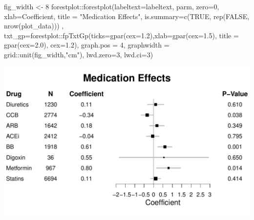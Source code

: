\documentclass[
]{article}
\newenvironment{Shaded}{\begin{snugshade}}{\end{snugshade}}
\newcommand{\AttributeTok}[1]{\textcolor[rgb]{0.77,0.63,0.00}{#1}}
\newcommand{\ConstantTok}[1]{\textcolor[rgb]{0.00,0.00,0.00}{#1}}
\newcommand{\DecValTok}[1]{\textcolor[rgb]{0.00,0.00,0.81}{#1}}
\newcommand{\FloatTok}[1]{\textcolor[rgb]{0.00,0.00,0.81}{#1}}
\newcommand{\FunctionTok}[1]{\textcolor[rgb]{0.00,0.00,0.00}{#1}}
\newcommand{\NormalTok}[1]{#1}
\newcommand{\OtherTok}[1]{\textcolor[rgb]{0.56,0.35,0.01}{#1}}
\newcommand{\SpecialCharTok}[1]{\textcolor[rgb]{0.00,0.00,0.00}{#1}}
\newcommand{\StringTok}[1]{\textcolor[rgb]{0.31,0.60,0.02}{#1}}
\begin{document}
\begin{Shaded}
\begin{Highlighting}[]
\NormalTok{fig\_width }\OtherTok{\textless{}{-}} \DecValTok{8}
\NormalTok{forestplot}\SpecialCharTok{::}\FunctionTok{forestplot}\NormalTok{(}\AttributeTok{labeltext=}\NormalTok{labeltext, }
\NormalTok{                       parm, }
                       \AttributeTok{zero=}\DecValTok{0}\NormalTok{, }
                       \AttributeTok{xlab=}\StringTok{\textquotesingle{}Coefficient\textquotesingle{}}\NormalTok{,}
                       \AttributeTok{title =} \StringTok{"Medication Effects"}\NormalTok{, }
                       \AttributeTok{is.summary=}\FunctionTok{c}\NormalTok{(}\ConstantTok{TRUE}\NormalTok{, }\FunctionTok{rep}\NormalTok{(}\ConstantTok{FALSE}\NormalTok{, }\FunctionTok{nrow}\NormalTok{(plot\_data))) ,}
                       \AttributeTok{txt\_gp=}\NormalTok{forestplot}\SpecialCharTok{::}\FunctionTok{fpTxtGp}\NormalTok{(}\AttributeTok{ticks=}\FunctionTok{gpar}\NormalTok{(}\AttributeTok{cex=}\FloatTok{1.2}\NormalTok{),}\AttributeTok{xlab=}\FunctionTok{gpar}\NormalTok{(}\AttributeTok{cex=}\FloatTok{1.5}\NormalTok{), }\AttributeTok{title =} \FunctionTok{gpar}\NormalTok{(}\AttributeTok{cex=}\FloatTok{2.0}\NormalTok{), }\AttributeTok{cex=}\FloatTok{1.2}\NormalTok{), }
                       \AttributeTok{graph.pos =} \DecValTok{4}\NormalTok{,}
                       \AttributeTok{graphwidth =}\NormalTok{ grid}\SpecialCharTok{::}\FunctionTok{unit}\NormalTok{(fig\_width,}\StringTok{"cm"}\NormalTok{), }
                       \AttributeTok{lwd.zero=}\DecValTok{3}\NormalTok{, }
                       \AttributeTok{lwd.ci=}\DecValTok{3}\NormalTok{)}
\end{Highlighting}
\end{Shaded}

\includegraphics{../results/report_files/figure-latex/med-effect-forest-ukbrlib-2-1.pdf}
\end{document}
